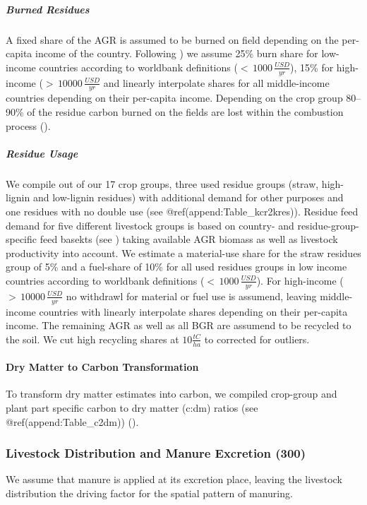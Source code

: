 \documentclass[gc, manuscript]{copernicus}
\begin{document}
\subparagraph{Burned Residues}

A fixed share of the AGR is assumed to be burned on field depending on
the per-capita income of the country. Following \citep{smil1999}) we
assume 25\% burn share for low-income countries according to worldbank
definitions (\(<\,1000\,\tfrac{USD}{yr}\)), 15\% for high-income
(\(>\,10000\,\tfrac{USD}{yr}\) and linearly interpolate shares for all
middle-income countries depending on their per-capita income. Depending
on the crop group 80--90\% of the residue carbon burned on the fields
are lost within the combustion process (\citep{ipcc_2006_2006}).

\subparagraph{Residue Usage}

We compile out of our 17 crop groups, three used residue groups (straw,
high-lignin and low-lignin residues) with additional demand for other
purposes and one residues with no double use (see
@ref(append:Table\_kcr2kres)). Residue feed demand for five different
livestock groups is based on country- and residue-group-specific feed
basekts (see \citep{weindl}) taking available AGR biomass as well as
livestock productivity into account. We estimate a material-use share
for the straw residues group of 5\% and a fuel-share of 10\% for all
used residues groups in low income countries according to worldbank
definitions (\(<\,1000\,\tfrac{USD}{yr}\)). For high-income
(\(>\,10000\,\tfrac{USD}{yr}\) no withdrawl for material or fuel use is
assumend, leaving middle-income countries with linearly interpolate
shares depending on their per-capita income. The remaining AGR as well
as all BGR are assumend to be recycled to the soil. We cut high
recycling shares at \(10\tfrac{\unit{tC}}{\unit{ha}}\) to corrected for
outliers.

\paragraph{Dry Matter to Carbon Transformation}

To transform dry matter estimates into carbon, we compiled crop-group
and plant part specific carbon to dry matter (c:dm) ratios (see
@ref(append:Table\_c2dm)) (\citet{Ma2018}).

\hypertarget{sec:livst_manure}{%
\subsubsection{Livestock Distribution and Manure Excretion
(300)}\label{sec:livst_manure}}

We assume that manure is applied at its excretion place, leaving the
livestock distribution the driving factor for the spatial pattern of
manuring.
\end{document}

